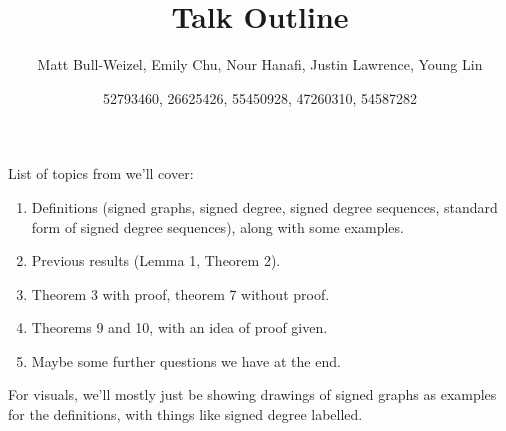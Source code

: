 \documentclass[12pt]{article}
\title{Talk Outline}
\author{Matt Bull-Weizel, Emily Chu, Nour Hanafi, Justin Lawrence, Young Lin}
\date{52793460, 26625426, 55450928, 47260310, 54587282}
\begin{document}
\maketitle

List of topics from \cite{MR1469358} we'll cover:

\begin{enumerate}
    \item Definitions (signed graphs, signed degree, signed degree sequences, standard form of signed degree sequences), along with some examples.
    \item Previous results (Lemma 1, Theorem 2).
    \item Theorem 3 with proof, theorem 7 without proof.
    \item Theorems 9 and 10, with an idea of proof given.
    \item Maybe some further questions we have at the end.
\end{enumerate}

For visuals, we'll mostly just be showing drawings of signed graphs as examples for the definitions, with things like signed degree labelled.



\end{document}
